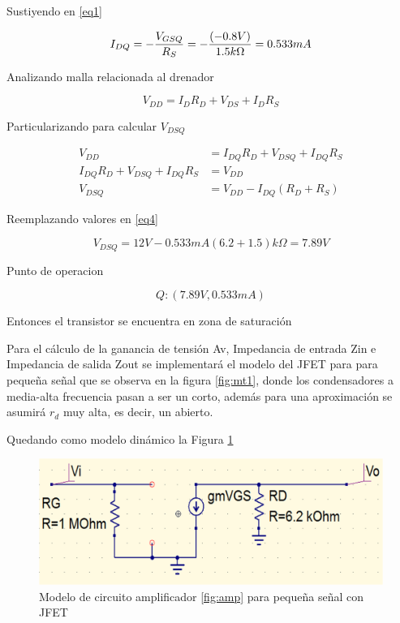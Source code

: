\documentclass[12pt, a4paper]{article}
\begin{document}
    Sustiyendo en \eqref{eq1}

    $$I_{DQ} = -{V_{GSQ} \over R_S} = -{(-0.8V) \over 1.5k\Omega} = 0.533mA$$

    Analizando malla relacionada al drenador

    $$V_{DD} = I_DR_D + V_{DS} + I_DR_S$$

    Particularizando para calcular $V_{DSQ}$

    \begin{equation}
        \label{eq4}
        \begin{split}
            V_{DD} & = I_{DQ}R_D + V_{DSQ} + I_{DQ}R_S \\
            I_{DQ}R_D + V_{DSQ} + I_{DQ}R_S & = V_{DD} \\
            V_{DSQ} & = V_{DD} - I_{DQ}(R_D + R_S)
        \end{split}
    \end{equation}
    
    Reemplazando valores en \eqref{eq4}

    $$V_{DSQ} = 12V - 0.533mA(6.2 + 1.5)k\Omega = 7.89V$$

    Punto de operacion

    $$Q : (7.89V, 0.533mA)$$

    Entonces el transistor se encuentra en zona de saturación
    
    Para el cálculo de la ganancia de tensión Av, Impedancia de entrada Zin e Impedancia de salida Zout se implementará el modelo del JFET para para pequeña señal que se observa en la figura \ref{fig:mt1}, donde los condensadores a media-alta frecuencia pasan a ser un corto, además para una aproximación se asumirá $r_d$ muy alta, es decir, un abierto.

    Quedando como modelo dinámico la Figura \ref{fig:din}

    \begin{figure}[h!]
        \centering
        \includegraphics[width=15cm\textwidth]{dinamico.png}
        \caption{Modelo de circuito amplificador \ref{fig:amp} para pequeña señal con JFET}
        \label{fig:din}
    \end{figure}
\end{document}
